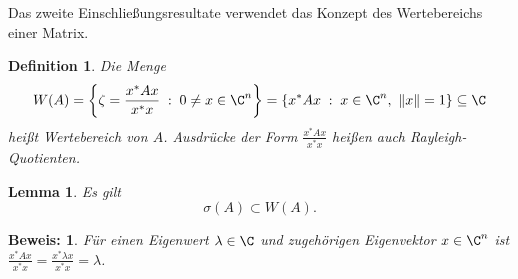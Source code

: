 \documentclass[
]{mycourse}
\theoremstyle{mythm}
\newtheorem{lemma}[theorem]{Lemma}
\newtheorem{definition}[theorem]{Definition}
\theoremstyle{break}
\newtheorem*{beweis}{Beweis:}
\newcommand{\norm}[1]{\left\Vert#1\right\Vert}		%
\newcommand{\dd}{\; : \;}    			      	%
\begin{document}
Das zweite Einschließungsresultate verwendet das Konzept des Wertebereichs einer Matrix.
\begin{definition}
Die Menge
\[
W(A)=\left\{ \zeta=\frac{x^* A x}{x^* x} \dd 0\neq x\in \C^n \right\}=\left\{ x^* A x \dd x\in \C^n,\ \norm{x}=1\right\}\subseteq \C
\]
heißt \emph{Wertebereich} von $A$. Ausdrücke der Form $\frac{x^* A x}{x^* x}$ heißen auch \emph{Rayleigh-Quotienten}.
\end{definition}


\begin{lemma}\label{lemma:W_enthaelt_sigma}
Es gilt
\[
\sigma(A)\subset W(A).
\]
\end{lemma}
\begin{beweis}
Für einen Eigenwert $\lambda\in \C$ und zugehörigen Eigenvektor $x\in \C^n$ ist
$\frac{x^* A x}{x^*x}=\frac{x^* \lambda x}{x^*x}=\lambda$. 
\end{beweis}
\end{document}
